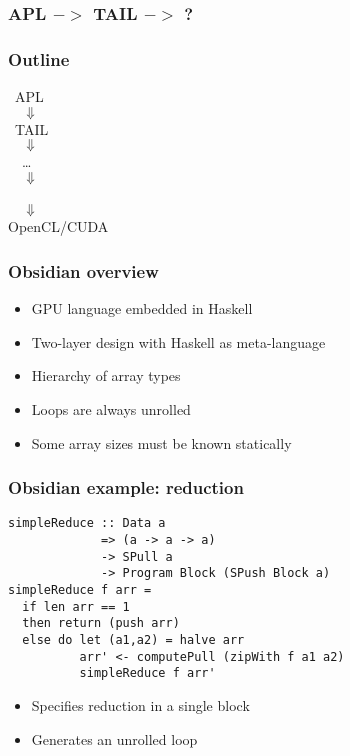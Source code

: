 \documentclass{beamer}
\begin{document}
\begin{frame}[fragile]
\frametitle{APL $->$ TAIL $->$ ?}
\begin{center}
\end{center}
\end{frame}


\begin{frame}
\frametitle{Outline}

~APL \\
$\quad\Downarrow$ \\
~TAIL \\
$\quad\Downarrow$\\
~~\ldots \\
$\quad\Downarrow$ \\
 \\
$\quad\Downarrow$ \\
OpenCL/CUDA
\end{frame}

\begin{frame}
\frametitle{Obsidian overview}
\begin{itemize}
\item GPU language embedded in Haskell
\item Two-layer design with Haskell as meta-language
\item Hierarchy of array types
\item Loops are always unrolled
\item Some array sizes must be known statically
\end{itemize}
\end{frame}

\begin{frame}[fragile]
  \frametitle{Obsidian example: reduction}

\begin{verbatim}
simpleReduce :: Data a 
             => (a -> a -> a)
             -> SPull a
             -> Program Block (SPush Block a)
simpleReduce f arr =
  if len arr == 1
  then return (push arr)
  else do let (a1,a2) = halve arr
          arr' <- computePull (zipWith f a1 a2)
          simpleReduce f arr'
\end{verbatim}
\pause
\begin{itemize}
\item Specifies reduction in a single block
\item Generates an unrolled loop
\end{itemize}
\end{frame}
\end{document}
